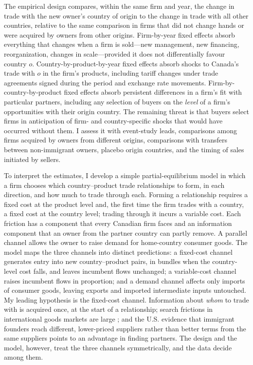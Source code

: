 \documentclass[12pt]{article}
\theoremstyle{remark}
\begin{document}
The empirical design compares, within the same firm and year, the change in
trade with the new owner's country of origin to the change in trade with all
other countries, relative to the same comparison in firms that did not change
hands or were acquired by owners from other origins. Firm-by-year fixed
effects absorb everything that changes when a firm is sold---new management,
new financing, reorganization, changes in scale---provided it does not
differentially favour country $o$. Country-by-product-by-year fixed effects
absorb shocks to Canada's trade with $o$ in the firm's products, including
tariff changes under trade agreements signed during the period and exchange
rate movements. Firm-by-country-by-product fixed effects absorb persistent
differences in a firm's fit with particular partners, including any selection
of buyers on the \emph{level} of a firm's opportunities with their origin
country. The remaining threat is that buyers select firms in anticipation of
firm- and country-specific shocks that would have occurred without them. I
assess it with event-study leads, comparisons among firms acquired by owners
from different origins, comparisons with transfers between non-immigrant
owners, placebo origin countries, and the timing of sales initiated by
sellers.

To interpret the estimates, I develop a simple partial-equilibrium model in
which a firm chooses which country--product trade relationships to form, in
each direction, and how much to trade through each. Forming a relationship
requires a fixed cost at the product level and, the first time the firm trades
with a country, a fixed cost at the country level; trading through it incurs a
variable cost. Each friction has a component that every Canadian firm faces
and an information component that an owner from the partner country can
partly remove. A parallel channel allows the owner to raise demand for
home-country consumer goods. The model maps the three channels into distinct
predictions: a fixed-cost channel generates entry into new country--product
pairs, in bundles when the country-level cost falls, and leaves incumbent
flows unchanged; a variable-cost channel raises incumbent flows in proportion;
and a demand channel affects only imports of consumer goods, leaving exports
and imported intermediate inputs untouched. My leading hypothesis is the
fixed-cost channel. Information about \emph{whom} to trade with is acquired
once, at the start of a relationship; search frictions in international goods
markets are large \citep{lenoir2023,startz2025}; and the U.S. evidence that
immigrant founders reach different, lower-priced suppliers rather than
better terms from the same suppliers \citep{chikissaygin2026} points to an
advantage in finding partners. The design and the model, however, treat the
three channels symmetrically, and the data decide among them.
\end{document}
